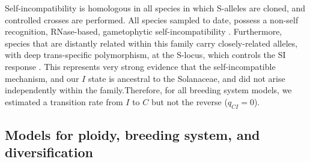 Self-incompatibility is homologous in all species in which S-alleles are cloned, and controlled crosses are performed. %
All species sampled to date, possess a non-self recognition, RNase-based, gametophytic self-incompatibility \citep[shared even with other euasterid families;][]{ramanauskas_2017}.
Furthermore, species that are distantly related within this family carry closely-related alleles, with deep trans-specific polymorphism, at the S-locus, which controls the SI response \citep{ioerger_1990, igic_2006}. %
This represents very strong evidence that the self-incompatible mechanism, and our $I$ state is ancestral to the Solanaceae, and did not arise independently within the family.Therefore, for all breeding system models, we estimated a transition rate from $I$ to $C$  but not the reverse ($q_{CI}=0$).
%

\subsection{Models for ploidy, breeding system, and diversification}

